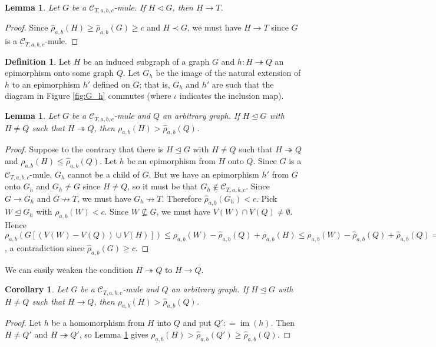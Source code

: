 \documentclass[12pt]{amsart}
\theoremstyle{plain}
\newtheorem{lem}[thm]{Lemma}
\newtheorem{cor}[thm]{Corollary}
\theoremstyle{definition}
\newtheorem{defn}{Definition}
\theoremstyle{remark}
\newcommand{\fancy}[1]{\mathcal{#1}}
\newcommand{\C}{\fancy{C}}
\newcommand{\surj}{\twoheadrightarrow}
\newcommand{\funcsurj}[3]{#1\colon #2 \surj #3}
\newcommand{\parens}[1]{\left( #1 \right)}
\newcommand{\brackets}[1]{\left[ #1 \right]}
\newcommand{\DefinedAs}{\mathrel{\mathop:}=}
\newcommand{\im}{\operatorname{im}}
\begin{document}
\begin{lem}\label{Criticality}
Let $G$ be a $\C_{T,a,b,c}$-mule.  If $H \lhd G$, then $H \rightarrow T$.
\end{lem}
\begin{proof}
Since $\hat{\rho}_{a,b}(H) \ge \hat{\rho}_{a,b}(G) \ge c$ and $H \prec G$, we must have $H \rightarrow T$ since $G$ is a $\C_{T,a,b,c}$-mule.
\end{proof}

\begin{defn}\label{InducedHomomorphism}
Let $H$ be an induced subgraph of a graph $G$ and $\funcsurj{h}{H}{Q}$ an epimorphism onto some graph $Q$. Let $G_h$ be the image of the natural extension of $h$ to an epimorphism $h'$ defined on $G$; that is, $G_h$ and $h'$ are such that the diagram in Figure \ref{fig:G_h} commutes (where $\iota$ indicates the inclusion map).
\end{defn}

\begin{lem}\label{ArbitraryQ}
Let $G$ be a $\C_{T,a,b,c}$-mule and $Q$ an arbitrary graph.  If $H \unlhd G$ with $H \ne Q$ such that $H \surj Q$, then $\rho_{a,b}(H) > \hat{\rho}_{a,b}(Q)$.
\end{lem}
\begin{proof}
Suppose to the contrary that there is $H \unlhd G$ with $H \ne Q$ such that $H \surj Q$ and $\rho_{a,b}(H) \le \hat{\rho}_{a,b}(Q)$.  
Let $h$ be an epimorphism from $H$ onto $Q$. Since $G$ is a $\C_{T,a,b,c}$-mule, $G_h$ cannot be a child of $G$.  But we have an epimorphism $h'$ from $G$ onto $G_h$ and $G_h \ne G$ since $H \ne Q$, so it must be that $G_h \not \in \C_{T,a,b,c}$.  Since $G \rightarrow G_h$ and $G \not \rightarrow T$, we must have $G_h \not \rightarrow T$.  Therefore $\hat{\rho}_{a,b}(G_h) < c$.  Pick $W \unlhd G_h$ with $\rho_{a,b}(W) < c$.  Since $W \not \subseteq G$, we must have $V(W) \cap V(Q) \ne \emptyset$.  Hence $\rho_{a,b}\parens{G\brackets{(V(W) - V(Q)) \cup V(H)}} \le \rho_{a,b}(W) - \hat{\rho}_{a,b}(Q) + \rho_{a,b}(H) \le  \rho_{a,b}(W) - \hat{\rho}_{a,b}(Q) + \hat{\rho}_{a,b}(Q) = \rho_{a,b}(W) < c$, a contradiction since $\hat{\rho}_{a,b}(G) \ge c$.
\end{proof}

We can easily weaken the condition $H \surj Q$ to $H \rightarrow Q$.

\begin{cor}\label{ArbitraryQInto}
Let $G$ be a $\C_{T,a,b,c}$-mule and $Q$ an arbitrary graph.  If $H \unlhd G$ with $H \ne Q$ such that $H \rightarrow Q$, then $\rho_{a,b}(H) > \hat{\rho}_{a,b}(Q)$.
\end{cor}
\begin{proof}
Let $h$ be a homomorphism from $H$ into $Q$ and put $Q' \DefinedAs \im(h)$.  Then $H \ne Q'$ and $H \surj Q'$, so Lemma \ref{ArbitraryQ} gives $\rho_{a,b}(H) > \hat{\rho}_{a,b}(Q') \ge  \hat{\rho}_{a,b}(Q)$.
\end{proof}
\end{document}
